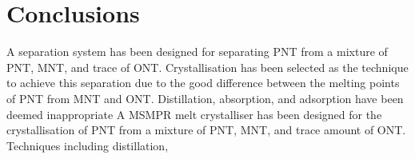\section{Conclusions}\label{separation conclusions}

A separation system has been designed for separating PNT from a mixture of PNT, MNT, and trace of ONT. Crystallisation has been selected as the technique to achieve this separation due to the good difference between the melting points of PNT from MNT and ONT. Distillation, absorption, and adsorption have been deemed inappropriate  A MSMPR melt crystalliser has been designed for the crystallisation of PNT from a mixture of PNT, MNT, and trace amount of ONT. Techniques including distillation, 